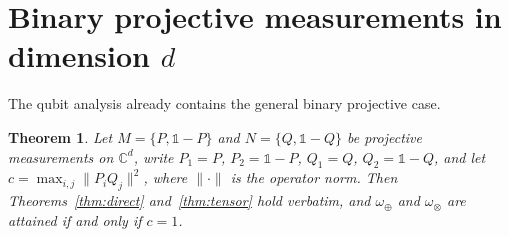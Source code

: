 \documentclass[aps,pra,twocolumn,superscriptaddress,nofootinbib,floatfix]{revtex4-2}
\newtheorem{theorem}{Theorem}
\theoremstyle{definition}
\newcommand{\omplus}{\omega_{\oplus}}
\newcommand{\omtimes}{\omega_{\otimes}}
\begin{document}
\section{Binary projective measurements in dimension \texorpdfstring{$d$}{d}}
\label{sec:dimd}

The qubit analysis already contains the general binary projective case.

\begin{theorem}
\label{thm:dimd}
Let $M=\{P,\mathds{1}-P\}$ and $N=\{Q,\mathds{1}-Q\}$ be projective measurements on
$\mathbb{C}^d$, write $P_1=P$, $P_2=\mathds{1}-P$, $Q_1=Q$, $Q_2=\mathds{1}-Q$, and
let $c=\max_{i,j}\|P_iQ_j\|^2$, where $\|\cdot\|$ is the operator norm. Then
Theorems~\ref{thm:direct} and~\ref{thm:tensor} hold verbatim, and $\omplus$ and
$\omtimes$ are attained if and only if $c=1$.
\end{theorem}
\end{document}

